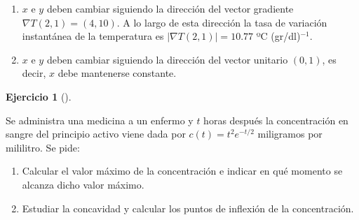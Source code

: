 \documentclass[
  a4paper,
]{scrreport}
\providecommand{\tightlist}{%
  \setlength{\itemsep}{0pt}\setlength{\parskip}{0pt}}\usepackage{longtable,booktabs,array}
\theoremstyle{definition}
\newtheorem{exercise}{Ejercicio}[chapter]
\theoremstyle{remark}
\begin{document}
\begin{tcolorbox}[enhanced jigsaw, opacitybacktitle=0.6, titlerule=0mm, bottomtitle=1mm, toptitle=1mm, breakable, bottomrule=.15mm, left=2mm, opacityback=0, toprule=.15mm, leftrule=.75mm, colframe=quarto-callout-tip-color-frame, coltitle=black, rightrule=.15mm, colback=white, title=\textcolor{quarto-callout-tip-color}{\faLightbulb}\hspace{0.5em}{Solución}, arc=.35mm, colbacktitle=quarto-callout-tip-color!10!white]

\begin{enumerate}
\def\labelenumi{\arabic{enumi}.}
\tightlist
\item
  \(x\) e \(y\) deben cambiar siguiendo la dirección del vector
  gradiente \(\nabla T(2,1) = (4, 10)\). A lo largo de esta dirección la
  tasa de variación instantánea de la temperatura es
  \(|\nabla T(2,1)|=10.77\) ºC (gr/dl)\(^{-1}\).
\item
  \(x\) e \(y\) deben cambiar siguiendo la dirección del vector unitario
  \((0, 1)\), es decir, \(x\) debe mantenerse constante.
\end{enumerate}

\end{tcolorbox}

\begin{exercise}[]\protect\hypertarget{exr-3}{}\label{exr-3}

Se administra una medicina a un enfermo y \(t\) horas después la
concentración en sangre del principio activo viene dada por
\(c(t) = t^2e^{-t/2}\) miligramos por mililitro. Se pide:

\begin{enumerate}
\def\labelenumi{\arabic{enumi}.}
\tightlist
\item
  Calcular el valor máximo de la concentración e indicar en qué momento
  se alcanza dicho valor máximo.
\item
  Estudiar la concavidad y calcular los puntos de inflexión de la
  concentración.
\end{enumerate}

\end{exercise}
\end{document}
